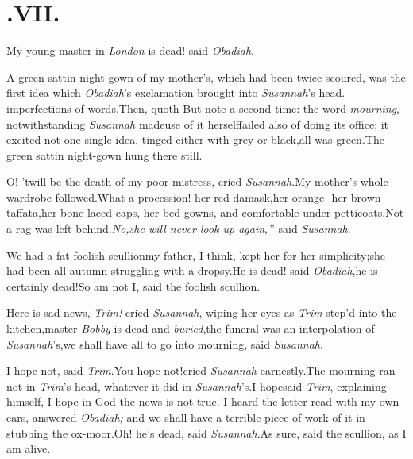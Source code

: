\documentclass{article}
\begin{document}
\section{.\enspace  VII.}

\etpp

\quad\tsh My young master in \textit{London} is dead!
said \textit{Obadiah}.\tsk

\tsk  A green sattin night-gown of my mother’s,
which had been twice scoured, was the first idea which
\textit{Obadiah}’s exclamation brought into
\textit{Susannah}’s head.\tsk\break 
{}
imperfections of words.\tsk Then, quoth\break
{}\break
\tsk But note a second time: the word
\textit{mou\-rning}, notwithstanding \textit{Susannah}
made\break use of it
herself\tsk failed also of doing its office; it excited not one
single idea, tinged either with grey or black,\tsk all was
green.\tsh The green sattin night-gown hung there
still.

\tsk O! ’twill be the death of my poor mistress, cried
\textit{Susannah}.\tsk My mother’s whole wardrobe
followed.\tsk What a procession! her red damask,\tsk her
orange-\break
{}\break
\tsk her brown taffata,\tsk her bone-laced caps, her bed-gowns, and
comfortable\break
under-petticoats.\tsk Not a rag was left
behind.\tsh \lqq\textit{No,\tsk she will never look up
again},\,” said \textit{Susannah}.

We had a fat foolish scullion\tsk my father, I think, kept
her for her simplicity;\break\tsk she had been all autumn struggling
with a dropsy.\tsk He is dead! said \textit{Obadiah},\tsk he is
certainly dead!\tsk So am not I, said the foolish scullion.

\tsh  Here is sad news, \textit{Trim!} cried
\textit{Susannah}, wiping her eyes as \textit{Trim} step’d 
into the kitchen,\tsk master \textit{Bobby} is dead and
\textit{buried},\tsk the funeral was an interpolation of
\textit{Susannah}’s,\tsk we shall have all to go into
mourning, said \textit{Susannah}.

I hope not, said \textit{Trim}.\tsk You hope not!\break cried
\textit{Susannah} earnestly.\tsk The mourning ran not in
\textit{Trim}’s head, whatever it did in
\textit{Susannah}’s.\tsk I hope\tsk said \textit{Trim},
explaining himself, I hope in God the news is not true. I heard the
letter read with my own ears, answered \textit{Obadiah;} and we shall
have a terrible piece of work of it in stubbing the
ox-moor.\tsk Oh! he’s dead, said \textit{Susannah}.\tsk As
sure, said the scullion, as I am alive.
\end{document}
